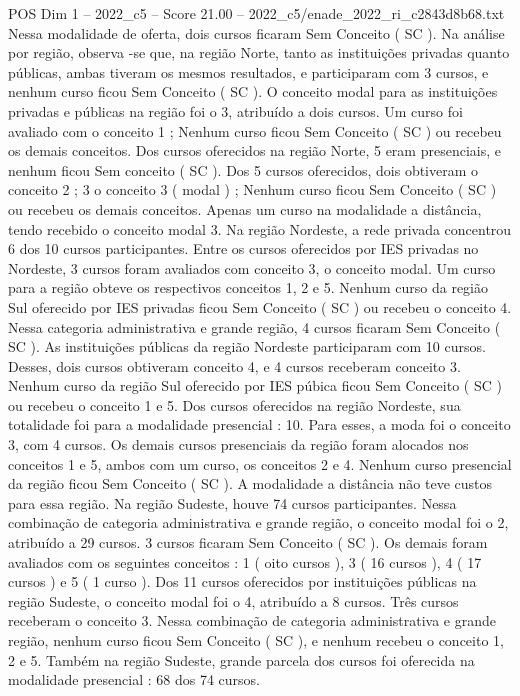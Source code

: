 \begin{textsample}{POS Dim 1 – 2022\_c5 – Score 21.00 – 2022\_c5/enade\_2022\_ri\_c2843d8b68.txt}
Nessa modalidade de oferta, dois cursos ficaram Sem Conceito ( SC ).
Na análise por região, observa -se que, na região Norte, tanto as instituições privadas quanto públicas, ambas tiveram os mesmos resultados, e participaram com 3 cursos, e nenhum curso ficou Sem Conceito ( SC ).
O conceito modal para as instituições privadas e públicas na região foi o 3, atribuído a dois cursos.
Um curso foi avaliado com o conceito 1 ; Nenhum curso ficou Sem Conceito ( SC ) ou recebeu os demais conceitos.
Dos cursos oferecidos na região Norte, 5 eram presenciais, e nenhum ficou Sem conceito ( SC ).
Dos 5 cursos oferecidos, dois obtiveram o conceito 2 ; 3 o conceito 3 ( modal ) ; Nenhum curso ficou Sem Conceito ( SC ) ou recebeu os demais conceitos.
Apenas um curso na modalidade a distância, tendo recebido o conceito modal 3.
Na região Nordeste, a rede privada concentrou 6 dos 10 cursos participantes.
Entre os cursos oferecidos por IES privadas no Nordeste, 3 cursos foram avaliados com conceito 3, o conceito modal.
Um curso para a região obteve os respectivos conceitos 1, 2 e 5.
Nenhum curso da região Sul oferecido por IES privadas ficou Sem Conceito ( SC ) ou recebeu o conceito 4.
Nessa categoria administrativa e grande região, 4 cursos ficaram Sem Conceito ( SC ).
As instituições públicas da região Nordeste participaram com 10 cursos.
Desses, dois cursos obtiveram conceito 4, e 4 cursos receberam conceito 3.
Nenhum curso da região Sul oferecido por IES púbica ficou Sem Conceito ( SC ) ou recebeu o conceito 1 e 5.
Dos cursos oferecidos na região Nordeste, sua totalidade foi para a modalidade presencial : 10.
Para esses, a moda foi o conceito 3, com 4 cursos.
Os demais cursos presenciais da região foram alocados nos conceitos 1 e 5, ambos com um curso, os conceitos 2 e 4.
Nenhum curso presencial da região ficou Sem Conceito ( SC ).
A modalidade a distância não teve custos para essa região.
Na região Sudeste, houve 74 cursos participantes.
Nessa combinação de categoria administrativa e grande região, o conceito modal foi o 2, atribuído a 29 cursos. 3 cursos ficaram Sem Conceito ( SC ).
Os demais foram avaliados com os seguintes conceitos : 1 ( oito cursos ), 3 ( 16 cursos ), 4 ( 17 cursos ) e 5 ( 1 curso ).
Dos 11 cursos oferecidos por instituições públicas na região Sudeste, o conceito modal foi o 4, atribuído a 8 cursos.
Três cursos receberam o conceito 3.
Nessa combinação de categoria administrativa e grande região, nenhum curso ficou Sem Conceito ( SC ), e nenhum recebeu o conceito 1, 2 e 5.
Também na região Sudeste, grande parcela dos cursos foi oferecida na modalidade presencial : 68 dos 74 cursos.

\end{textsample}
